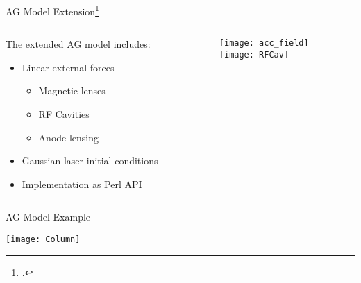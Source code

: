 \begin{frame}{AG Model Extension\footcite{berger_semi-analytic_2010}}
\begin{columns}
  \begin{column}{0.54\linewidth}
    The extended AG model includes:
    \begin{itemize}
      \item Linear external forces
      \begin{itemize}
        \item<2-> Magnetic lenses
        \item<2-> RF Cavities
        \item<3-> Anode lensing
      \end{itemize}
      \item<4-> Gaussian laser initial conditions
      \item<5-> Implementation as Perl API
    \end{itemize}
  \end{column}
  \begin{column}{0.4\linewidth}
    \begin{figure}
      \centering
      \texttt{[image: acc\_field]}\\
      \texttt{[image: RFCav]}
    \end{figure}
  \end{column}
\end{columns}
\end{frame}

\begin{frame}{AG Model Example}
  \begin{center}
    \texttt{[image: Column]}
  \end{center}
\end{frame}
